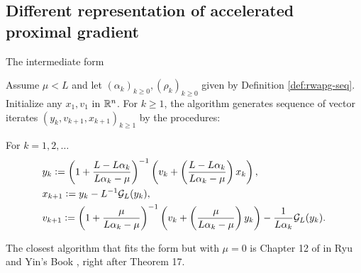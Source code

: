 \documentclass[11pt]{beamer}
\theoremstyle{definition}
\begin{document}
    \subsection{Different representation of accelerated proximal gradient}
        \begin{frame}{The intermediate form}
            \begin{definition}\label{def:r-wapg-intermediate}
                {\footnotesize
                Assume $\mu < L$ and let $(\alpha_k)_{k \ge 0}, (\rho_k)_{k \ge 0}$ given by Definition \ref{def:rwapg-seq}.
                Initialize any $x_1, v_1$ in $\mathbb R^n$.
                For $k \ge 1$, the algorithm generates sequence of vector iterates $(y_{k}, v_{k + 1}, x_{k + 1})_{k \ge 1}$ by the procedures:
                \begin{tcolorbox}
                    For $k = 1, 2, \ldots$
                    \begin{align*}
                        & y_{k} \vcentcolon=
                        \left(
                            1 + \frac{L - L\alpha_{k}}{L\alpha_{k} - \mu}
                        \right)^{-1}
                        \left(
                            v_{k} +
                            \left(\frac{L - L\alpha_{k}}{L\alpha_{k} - \mu} \right) x_{k}
                        \right),
                        \\
                        & x_{k + 1} \vcentcolon=
                        y_k - L^{-1} \mathcal G_L (y_k),
                        \\
                        & v_{k + 1} \vcentcolon=
                        \left(
                            1 + \frac{\mu}{L \alpha_k - \mu}
                        \right)^{-1}
                        \left(
                            v_k +
                            \left(\frac{\mu}{L \alpha_k - \mu}\right) y_k
                        \right) - \frac{1}{L\alpha_{k}}\mathcal G_L (y_k).
                    \end{align*}
                \end{tcolorbox}
                }
            \end{definition}
            The closest algorithm that fits the form but with $\mu = 0$ is Chapter 12 of in Ryu and Yin's Book \cite{ryu_large-scale_2022}, right after Theorem 17. 
        \end{frame}
\end{document}
